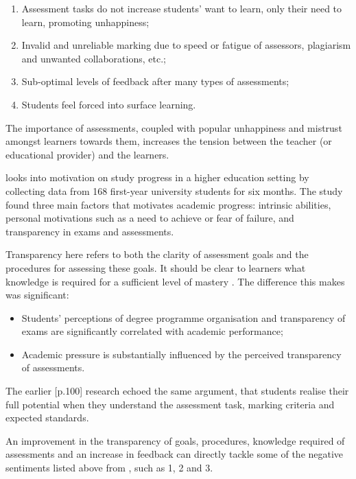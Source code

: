 \begin{enumerate}
	\setlength\itemsep{0em}
	\item Assessment tasks do not increase students' want to learn, only their need to learn, promoting unhappiness;
	\item Invalid and unreliable marking due to speed or fatigue of assessors, plagiarism and unwanted collaborations, etc.;
	\item Sub-optimal levels of feedback after many types of assessments;
	\item Students feel forced into surface learning.\\
	      \citep[p.62-65]{brown1999assessment}
\end{enumerate}

The importance of assessments, coupled with popular unhappiness and mistrust amongst learners towards
them, increases the tension between the teacher (or educational provider) and the learners.

\citet{suhre2013determinants} looks into motivation on study progress in a higher education setting by collecting data
from 168 first-year university students for six months. The study found three main factors that motivates academic
progress: intrinsic abilities, personal motivations such as a need to achieve or fear of failure, and transparency in
exams and assessments.

Transparency here refers to both the clarity of assessment goals and the procedures for assessing these goals.
It should be clear to learners what knowledge is required for a sufficient level of mastery \citep{suhre2013determinants}.
The difference this makes was significant:

\begin{itemize}
	\setlength\itemsep{0em}
	\item Students' perceptions of degree programme organisation and transparency of exams are
	      significantly correlated with academic performance;
	\item Academic pressure is substantially influenced by the perceived transparency of assessments.
\end{itemize}

The earlier [p.100]\citet{bryan2006innovative} research echoed the same argument, that students realise their full potential
when they understand the assessment task, marking criteria and expected standards.

An improvement in the transparency of goals, procedures, knowledge required of assessments and an increase
in feedback can directly tackle some of the negative sentiments listed above from \citet{brown1999assessment},
such as 1, 2 and 3.


